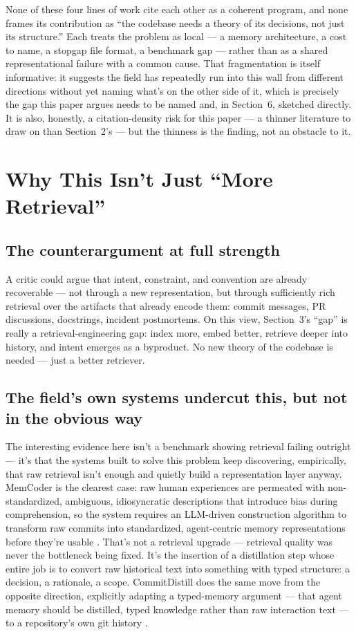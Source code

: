 \documentclass[11pt]{article}
\begin{document}
None of these four lines of work cite each other as a coherent program, and none frames its contribution as ``the codebase needs a theory of its decisions, not just its structure.'' Each treats the problem as local --- a memory architecture, a cost to name, a stopgap file format, a benchmark gap --- rather than as a shared representational failure with a common cause. That fragmentation is itself informative: it suggests the field has repeatedly run into this wall from different directions without yet naming what's on the other side of it, which is precisely the gap this paper argues needs to be named and, in Section~6, sketched directly. It is also, honestly, a citation-density risk for this paper --- a thinner literature to draw on than Section~2's --- but the thinness is the finding, not an obstacle to it.

\section{Why This Isn't Just ``More Retrieval''}

\subsection{The counterargument at full strength}

A critic could argue that intent, constraint, and convention are already recoverable --- not through a new representation, but through sufficiently rich retrieval over the artifacts that already encode them: commit messages, PR discussions, docstrings, incident postmortems. On this view, Section~3's ``gap'' is really a retrieval-engineering gap: index more, embed better, retrieve deeper into history, and intent emerges as a byproduct. No new theory of the codebase is needed --- just a better retriever.

\subsection{The field's own systems undercut this, but not in the obvious way}

The interesting evidence here isn't a benchmark showing retrieval failing outright --- it's that the systems built to solve this problem keep discovering, empirically, that raw retrieval isn't enough and quietly build a representation layer anyway. MemCoder is the clearest case: raw human experiences are permeated with non-standardized, ambiguous, idiosyncratic descriptions that introduce bias during comprehension, so the system requires an LLM-driven construction algorithm to transform raw commits into standardized, agent-centric memory representations before they're usable \citep{memcoder2026}. That's not a retrieval upgrade --- retrieval quality was never the bottleneck being fixed. It's the insertion of a distillation step whose entire job is to convert raw historical text into something with typed structure: a decision, a rationale, a scope. CommitDistill does the same move from the opposite direction, explicitly adapting a typed-memory argument --- that agent memory should be distilled, typed knowledge rather than raw interaction text --- to a repository's own git history \citep{commitdistill2026}.
\end{document}
